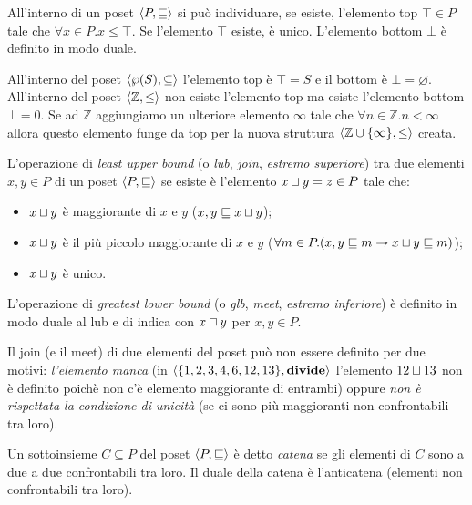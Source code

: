 \begin{definition}
All'interno di un poset $\langle P, \sqsubseteq \rangle$ si può individuare, se esiste, l'elemento top $\top \in P$ tale che $\forall x \in P . x \le \top$. Se l'elemento $\top$ esiste, è unico. L'elemento bottom $\bot$ è definito in modo duale.
\end{definition}

All'interno del poset $\langle \wp(S), \subseteq \rangle$ l'elemento top è $\top = S$ e il bottom è $\bot = \varnothing$. All'interno del poset $\langle \mathbb{Z}, \le \rangle$ non esiste l'elemento top ma esiste l'elemento bottom $\bot = 0$. Se ad $\mathbb{Z}$ aggiungiamo un ulteriore elemento $\infty$ tale che $\forall n \in \mathbb{Z} . n < \infty$ allora questo elemento funge da top per la nuova struttura $\langle \mathbb{Z} \cup \{ \infty \}, \le \rangle$ creata.

\begin{definition}
L'operazione di \emph{least upper bound} (o \emph{lub}, \emph{join}, \emph{estremo superiore}) tra due elementi $x,y \in P$ di un poset $\langle P, \sqsubseteq \rangle$ se esiste è l'elemento $\join[x][y] = z \in P$ tale che:
\begin{itemize}
    \item $\join[x][y]$ è maggiorante di $x$ e $y$ ($x,y \sqsubseteq \join[x][y]$);
    \item $\join[x][y]$ è il più piccolo maggiorante di $x$ e $y$ ($\forall m \in P . (x,y \sqsubseteq m \to \join[x][y] \sqsubseteq m)$);
    \item $\join[x][y]$ è unico.
\end{itemize}
\end{definition}

\begin{definition}
L'operazione di \emph{greatest lower bound} (o \emph{glb}, \emph{meet}, \emph{estremo inferiore}) è definito in modo duale al lub e di indica con $\meet[x][y]$ per $x,y \in P$.
\end{definition}

Il join (e il meet) di due elementi del poset può non essere definito per due motivi: \emph{l'elemento manca} (in $\langle \{1,2,3,4,6,12,13\}, \mathbf{divide} \rangle$ l'elemento $\join[12][13]$ non è definito poichè non c'è elemento maggiorante di entrambi) oppure \emph{non è rispettata la condizione di unicità} (se ci sono più maggioranti non confrontabili tra loro).

\begin{definition}[Catena]
Un sottoinsieme $C \subseteq P$ del poset $\langle P, \sqsubseteq \rangle$ è detto \emph{catena} se gli elementi di $C$ sono a due a due confrontabili tra loro. Il duale della catena è l'anticatena (elementi non confrontabili tra loro).  
\end{definition}

